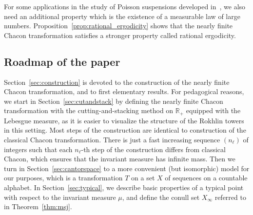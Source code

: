 \documentclass[10pt]{amsart}
\theoremstyle{definition}\newtheorem{defi}[theo]{Definition}\newtheorem{rema}[theo]{Remark}\newtheorem{exam}[theo]{Example}\newtheorem{exem}[theo]{Example}\newtheorem{nota}[theo]{Notation}
\newcommand{\RR}{\mathbb{R}}
\begin{document}
For some applications in the study of Poisson suspensions developed in~\cite{sushis}, we also need an additional property which is the existence of a measurable law of large numbers. Proposition~\ref{prop:rational_ergodicity} shows that the nearly finite Chacon transformation satisfies a stronger property called rational ergodicity.

\subsection{Roadmap of the paper}

Section~\ref{sec:construction} is devoted to the construction of the nearly finite Chacon transformation, and to first elementary results. For pedagogical reasons, we start in Section~\ref{sec:cutandstack} by defining the nearly finite Chacon transformation with the cutting-and-stacking method on $ \RR_+$ equipped with the Lebesgue measure, as it is easier to visualize the structure of the Rokhlin towers in this setting. Most steps of the construction are identical to construction of the classical Chacon transformation. There is just a fast increasing sequence $(n_\ell)$ of integers such that each $n_\ell$-th step of the construction differs from classical Chacon, which ensures that the invariant measure has infinite mass. Then we turn in Section~\ref{sec:cantorspace} to a more convenient (but isomorphic) model for our purposes, which is a transformation $T$ on a set $X$ of sequences on a countable alphabet. In Section~\ref{sec:typical}, we describe basic properties of a typical point with respect to the invariant measure $\mu$, and define the conull set $X_\infty$ referred to in Theorem~\ref{thm:msj}.
\end{document}
